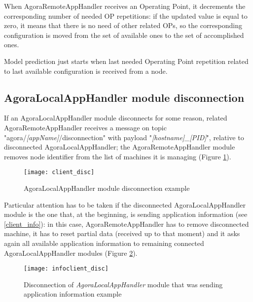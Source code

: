 When AgoraRemoteAppHandler receives an Operating Point, it decrements the corresponding number of needed OP repetitions: if the updated value is equal to zero, it means that there is no need of other related OPs, so the corresponding configuration is moved from the set of available ones to the set of accomplished ones.

Model prediction just starts when last needed Operating Point repetition related to last available configuration is received from a node.





\subsection{AgoraLocalAppHandler module disconnection}\label{client_disc}

If an AgoraLocalAppHandler module disconnects for some reason, related Agora\-Remote\-App\-Handler receives a message on topic "agora\slash{}\textit{[appName]}\slash{}dis\-con\-nec\-tion" with payload "\textit{[hostname]\_[PID]}", relative to disconnected AgoraLocalAppHandler; the AgoraRemote\-App\-Handler module removes node identifier from the list of machines it is managing (Figure \ref{fig::locDisc}).

\begin{figure}[ht]

    \centering
    \texttt{[image: client\_disc]}
    \caption{AgoraLocalAppHandler module disconnection example}

    \label{fig::locDisc}
    
\end{figure}

Particular attention has to be taken if the disconnected AgoraLocalAppHandler module is the one that, at the beginning, is sending application information (see \ref{client_info}): in this case, AgoraRemoteAppHandler has to remove disconnected machine, it has to reset partial data (received up to that moment) and it asks again all available application information to remaining connected Agora\-Local\-App\-Handler modules (Figure \ref{fig::locInfoDisc}).

\begin{figure}[hb]

    \centering
    \texttt{[image: infoclient\_disc]}
    \caption{Disconnection of \textit{AgoraLocalAppHandler} module that was sending application information example}

    \label{fig::locInfoDisc}
    
\end{figure}





